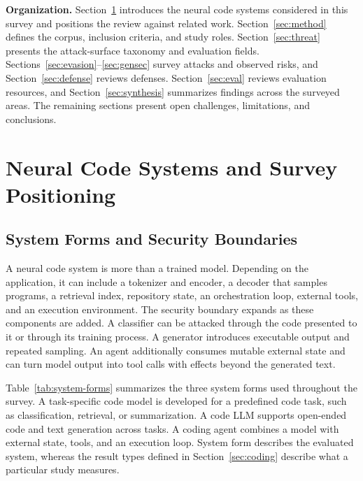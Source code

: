 \documentclass[acmsmall,screen,review]{acmart}
\begin{document}
\noindent\textbf{Organization.}
Section~\ref{sec:related} introduces the neural code systems considered in this survey and positions the review against related work. Section~\ref{sec:method} defines the corpus, inclusion criteria, and study roles. Section~\ref{sec:threat} presents the attack-surface taxonomy and evaluation fields. Sections~\ref{sec:evasion}--\ref{sec:gensec} survey attacks and observed risks, and Section~\ref{sec:defense} reviews defenses. Section~\ref{sec:eval} reviews evaluation resources, and Section~\ref{sec:synthesis} summarizes findings across the surveyed areas. The remaining sections present open challenges, limitations, and conclusions.



\section{Neural Code Systems and Survey Positioning} 
\label{sec:related}


\subsection{System Forms and Security Boundaries}
A neural code system is more than a trained model. Depending on the application, it can include a tokenizer and encoder, a decoder that samples programs, a retrieval index, repository state, an orchestration loop, external tools, and an execution environment. The security boundary expands as these components are added. A classifier can be attacked through the code presented to it or through its training process. A generator introduces executable output and repeated sampling. An agent additionally consumes mutable external state and can turn model output into tool calls with effects beyond the generated text.

Table~\ref{tab:system-forms} summarizes the three system forms used throughout the survey. A task-specific code model is developed for a predefined code task, such as classification, retrieval, or summarization. A code LLM supports open-ended code and text generation across tasks. A coding agent combines a model with external state, tools, and an execution loop. System form describes the evaluated system, whereas the result types defined in Section~\ref{sec:coding} describe what a particular study measures. 
\end{document}
